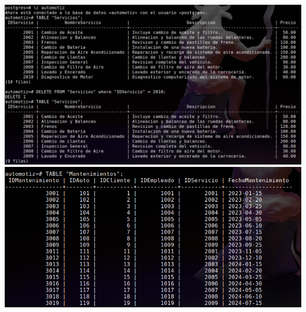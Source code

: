 \documentclass[12pt]{article}
\begin{document}
        \includegraphics[width=1.0\textwidth]{Prueba1.png}
        \includegraphics[width=1.0\textwidth]{Prueba2.png}
\end{document}
